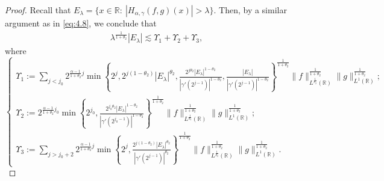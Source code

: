 \documentclass[11pt, twoside, leqno]{article}
\theoremstyle{definition}
\numberwithin{equation}{section}
\begin{document}
\begin{proof}
Recall that $E_{\lambda}=\{x\in{\mathbb{R}}:\ |H_{\alpha,\gamma}(f,g)(x)|>\lambda\}$. Then, by a similar argument as in \eqref{eq:4.8}, we conclude that
\begin{align}\label{eq:5.2}
 \lambda^{\frac{1}{1+\theta_2}}|E_{\lambda}|\lesssim \Upsilon_{1}+\Upsilon_{2}+\Upsilon_{3},
  \end{align}
where
$$\begin{cases}
   \Upsilon_{1}:=\sum\limits_{j<j_{0}}2^{{\frac{\alpha-1}{1+\theta_{2}}j}}\min\left\{2^j,2^{j(1-\theta_{2})}|E_{\lambda}|^{\theta_{2}},{\frac{2^{j\theta_2}|E_{\lambda}|^{1-\theta_{2}}}{|\gamma'(2^{j-1})|^{1-\theta_{2}}}} ,{\frac{|E_{\lambda}|}{|\gamma'(2^{j-1})|^{1-\theta_{2}}}}\right\}^{\frac{1}{1+\theta_2}}\|f\|^{\frac{1}{1+\theta_2}}_{L^{\frac{1}{\theta_2}}(\mathbb{R})}\|g\|^{\frac{1}{1+\theta_2}}_{L^{1}(\mathbb{R})}; \\
  \Upsilon_{2}:=2^{{\frac{\alpha-1}{1+\theta_{2}}}j_{0}}\min\left\{2^{j_0},\frac{2^{{j_0}\theta_{2}}|E_{\lambda}|^{1-\theta_{2}}}{ |\gamma'(2^{j_0-1})|^{1-\theta_{2}} }\right\}^{\frac{1}{1+\theta_2}}\|f\|^{\frac{1}{1+\theta_2}}_{L^{\frac{1}{\theta_2}}(\mathbb{R})}\|g\|^{\frac{1}{1+\theta_2}}_{L^{1}(\mathbb{R})};\\
 \Upsilon_{3}:=\sum\limits_{j>j_{0}+2}2^{{\frac{\alpha-1}{1+\theta_{2}}}j}\min\left\{2^j,  \frac{2^{j(1-\theta_2)}|E_{\lambda}|^{\theta_2}}{|\gamma'(2^{j-1})|^{\theta_2}} \right\}^{\frac{1}{1+\theta_2}} \|f\|^{\frac{1}{1+\theta_2}}_{L^{\frac{1}{\theta_2}}(\mathbb{R})}\|g\|^{\frac{1}{1+\theta_2}}_{L^{1}(\mathbb{R})}.
 \end{cases}$$


\end{proof}
\end{document}
